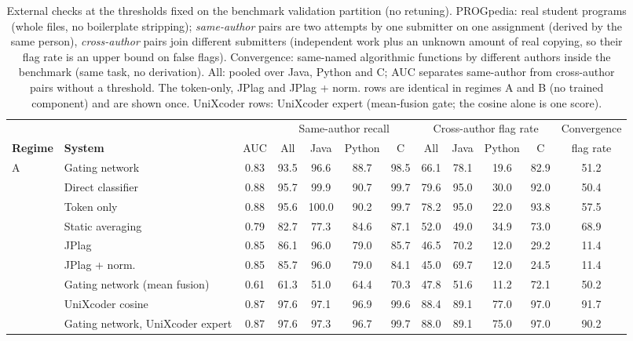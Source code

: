 \begin{table}[t]
\centering
\caption{External checks at the thresholds fixed on the benchmark validation partition (no retuning). PROGpedia: real student programs (whole files, no boilerplate stripping); \emph{same-author} pairs are two attempts by one submitter on one assignment (derived by the same person), \emph{cross-author} pairs join different submitters (independent work plus an unknown amount of real copying, so their flag rate is an upper bound on false flags). Convergence: same-named algorithmic functions by different authors inside the benchmark (same task, no derivation). All: pooled over Java, Python and C; AUC separates same-author from cross-author pairs without a threshold. The token-only, JPlag and JPlag + norm. rows are identical in regimes A and B (no trained component) and are shown once. UniXcoder rows: UniXcoder expert (mean-fusion gate; the cosine alone is one score).}
\label{tab:external}
\scriptsize
\setlength{\tabcolsep}{3pt}
\begin{tabular}{ll|c|cccc|cccc|c}
\toprule
 & & & \multicolumn{4}{c|}{Same-author recall} & \multicolumn{4}{c|}{Cross-author flag rate} & Convergence \\
\textbf{Regime} & \textbf{System} & AUC & All & Java & Python & C & All & Java & Python & C & flag rate \\
\midrule
A & Gating network & 0.83 & 93.5 & 96.6 & 88.7 & 98.5 & 66.1 & 78.1 & 19.6 & 82.9 & 51.2 \\
 & Direct classifier & 0.88 & 95.7 & 99.9 & 90.7 & 99.7 & 79.6 & 95.0 & 30.0 & 92.0 & 50.4 \\
 & Token only & 0.88 & 95.6 & 100.0 & 90.2 & 99.7 & 78.2 & 95.0 & 22.0 & 93.8 & 57.5 \\
 & Static averaging & 0.79 & 82.7 & 77.3 & 84.6 & 87.1 & 52.0 & 49.0 & 34.9 & 73.0 & 68.9 \\
 & JPlag & 0.85 & 86.1 & 96.0 & 79.0 & 85.7 & 46.5 & 70.2 & 12.0 & 29.2 & 11.4 \\
 & JPlag + norm. & 0.85 & 85.7 & 96.0 & 79.0 & 84.1 & 45.0 & 69.7 & 12.0 & 24.5 & 11.4 \\
 & Gating network (mean fusion) & 0.61 & 61.3 & 51.0 & 64.4 & 70.3 & 47.8 & 51.6 & 11.2 & 72.1 & 50.2 \\
 & UniXcoder cosine & 0.87 & 97.6 & 97.1 & 96.9 & 99.6 & 88.4 & 89.1 & 77.0 & 97.0 & 91.7 \\
 & Gating network, UniXcoder expert & 0.87 & 97.6 & 97.3 & 96.7 & 99.7 & 88.0 & 89.1 & 75.0 & 97.0 & 90.2 \\

\end{tabular}
\end{table}
